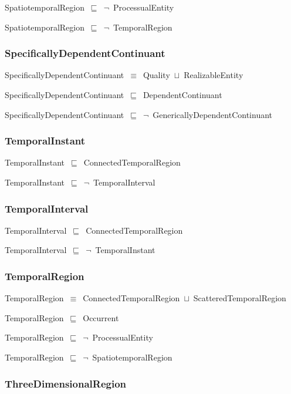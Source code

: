 \documentclass{article}
\begin{document}
SpatiotemporalRegion~\ensuremath{\sqsubseteq}~\ensuremath{\lnot}~ProcessualEntity

SpatiotemporalRegion~\ensuremath{\sqsubseteq}~\ensuremath{\lnot}~TemporalRegion

\subsubsection*{SpecificallyDependentContinuant}

SpecificallyDependentContinuant~\ensuremath{\equiv}~Quality~\ensuremath{\sqcup}~RealizableEntity

SpecificallyDependentContinuant~\ensuremath{\sqsubseteq}~DependentContinuant~

SpecificallyDependentContinuant~\ensuremath{\sqsubseteq}~\ensuremath{\lnot}~GenericallyDependentContinuant

\subsubsection*{TemporalInstant}

TemporalInstant~\ensuremath{\sqsubseteq}~ConnectedTemporalRegion~

TemporalInstant~\ensuremath{\sqsubseteq}~\ensuremath{\lnot}~TemporalInterval

\subsubsection*{TemporalInterval}

TemporalInterval~\ensuremath{\sqsubseteq}~ConnectedTemporalRegion~

TemporalInterval~\ensuremath{\sqsubseteq}~\ensuremath{\lnot}~TemporalInstant

\subsubsection*{TemporalRegion}

TemporalRegion~\ensuremath{\equiv}~ConnectedTemporalRegion~\ensuremath{\sqcup}~ScatteredTemporalRegion

TemporalRegion~\ensuremath{\sqsubseteq}~Occurrent~

TemporalRegion~\ensuremath{\sqsubseteq}~\ensuremath{\lnot}~ProcessualEntity

TemporalRegion~\ensuremath{\sqsubseteq}~\ensuremath{\lnot}~SpatiotemporalRegion

\subsubsection*{ThreeDimensionalRegion}
\end{document}
